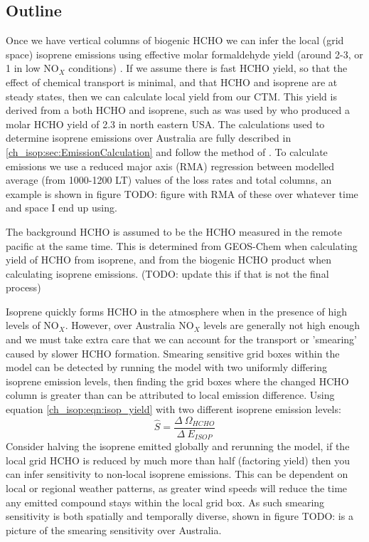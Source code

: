   \subsection{Outline}
    Once we have vertical columns of biogenic HCHO we can infer the local (grid space) isoprene emissions using effective molar formaldehyde yield (around 2-3, or 1 in low NO$_X$ conditions) \citep{Palmer2003,Marais2013,Bauwens2016}.
    If we assume there is fast HCHO yield, so that the effect of chemical transport is minimal, and that HCHO and isoprene are at steady states, then we can calculate local yield from our CTM.
    This yield is derived from a both HCHO and isoprene, such as was used by \citet{Millet2006} who produced a molar HCHO yield of 2.3 in north eastern USA.
    The calculations used to determine isoprene emissions over Australia are fully described in \ref{ch_isop:sec:EmissionCalculation} and follow the method of \citet{Palmer2003}.
    To calculate emissions we use a reduced major axis (RMA) regression between modelled average (from 1000-1200 LT) values of the loss rates and total columns, an example is shown in figure TODO: figure with RMA of these over whatever time and space I end up using.
    
    The background HCHO is assumed to be the HCHO measured in the remote pacific at the same time.
    This is determined from GEOS-Chem when calculating yield of HCHO from isoprene, and from the biogenic HCHO product when calculating isoprene emissions. (TODO: update this if that is not the final process)
    
    Isoprene quickly forms HCHO in the atmosphere when in the presence of high levels of NO$_X$.
    However, over Australia NO$_X$ levels are generally not high enough and we must take extra care that we can account for the transport or 'smearing' caused by slower HCHO formation.
    Smearing sensitive grid boxes within the model can be detected by running the model with two uniformly differing isoprene emission levels, then finding the grid boxes where the changed HCHO column is greater than can be attributed to local emission difference.
    Using equation \ref{ch_isop:eqn:isop_yield} with two different isoprene emission levels:
    \begin{equation*}
      \hat{S} = \frac{\Delta~\Omega_{HCHO}}{\Delta~E_{ISOP}}
    \end{equation*}
    Consider halving the isoprene emitted globally and rerunning the model, if the local grid HCHO is reduced by much more than half (factoring yield) then you can infer sensitivity to non-local isoprene emissions.
    This can be dependent on local or regional weather patterns, as greater wind speeds will reduce the time any emitted compound stays within the local grid box.
    As such smearing sensitivity is both spatially and temporally diverse, shown in figure TODO: is a picture of the smearing sensitivity over Australia.
   
